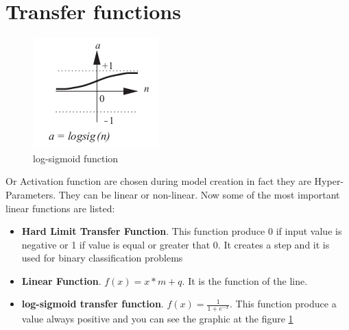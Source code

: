 \documentclass[12pt,a4paper,twoside,openright]{scrbook}
\begin{document}
\section{Transfer functions}
\begin{figure}
    \centering
    \includegraphics[scale=0.65]{img/log-sigmoid-function.png}
    \caption{log-sigmoid function}
    \label{img:log-sigmoid}
\end{figure}{}
Or Activation function are chosen during model creation in fact they are Hyper-Parameters. They can be linear or non-linear. Now some of the most important linear functions are listed:
\begin{itemize}
\item \textbf{Hard Limit Transfer Function}. This function produce 0 if input value is negative or 1 if value is equal or greater that 0. It creates a step and it is used for binary classification problems
\item \textbf{Linear Function}. $f(x) = x*m +q$. It is the function of the line.
\item \textbf{log-sigmoid transfer function}. $f(x) = \frac{1}{1+e^{-x}}$. This function produce a value always positive and you can see the graphic at the figure \ref{img:log-sigmoid}
\end{itemize}
\end{document}
